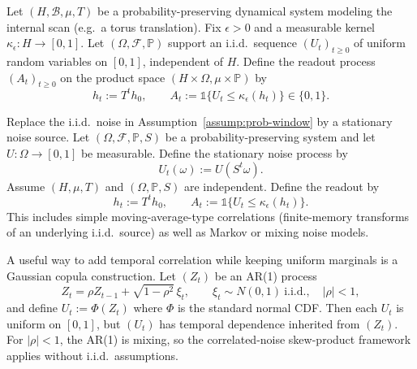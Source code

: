 \begin{assumption}\label{assump:prob-window}
Let $(H,\mathcal{B},\mu,T)$ be a probability-preserving dynamical system modeling the internal scan (e.g.\ a torus translation). Fix $\epsilon>0$ and a measurable kernel $\kappa_\epsilon:H\to[0,1]$. Let $(\Omega,\mathcal{F},\mathbb{P})$ support an i.i.d.\ sequence $(U_t)_{t\ge 0}$ of uniform random variables on $[0,1]$, independent of $H$.
Define the readout process $(A_t)_{t\ge 0}$ on the product space $(H\times\Omega,\mu\times\mathbb{P})$ by
\[
h_t := T^t h_0,\qquad
A_t := \mathds{1}\{U_t \le \kappa_\epsilon(h_t)\}\in\{0,1\}.
\]
\end{assumption}

\begin{assumption}\label{assump:prob-window-correlated}
Replace the i.i.d.\ noise in Assumption~\ref{assump:prob-window} by a stationary noise source. Let $(\Omega,\mathcal{F},\mathbb{P},S)$ be a probability-preserving system and let $U:\Omega\to[0,1]$ be measurable. Define the stationary noise process by
\[
U_t(\omega):=U(S^t\omega).
\]
Assume $(H,\mu,T)$ and $(\Omega,\mathbb{P},S)$ are independent. Define the readout by
\[
h_t := T^t h_0,\qquad
A_t := \mathds{1}\{U_t \le \kappa_\epsilon(h_t)\}.
\]
This includes simple moving-average-type correlations (finite-memory transforms of an underlying i.i.d.\ source) as well as Markov or mixing noise models.
\end{assumption}

\begin{remark}\label{rem:ar1-copula}
A useful way to add temporal correlation while keeping uniform marginals is a Gaussian copula construction. Let $(Z_t)$ be an AR(1) process
\[
Z_t=\rho Z_{t-1}+\sqrt{1-\rho^2}\,\xi_t,\qquad \xi_t\sim N(0,1)\ \text{i.i.d.},\quad |\rho|<1,
\]
and define $U_t:=\Phi(Z_t)$ where $\Phi$ is the standard normal CDF. Then each $U_t$ is uniform on $[0,1]$, but $(U_t)$ has temporal dependence inherited from $(Z_t)$. For $|\rho|<1$, the AR(1) is mixing, so the correlated-noise skew-product framework applies without i.i.d.\ assumptions.
\end{remark}


